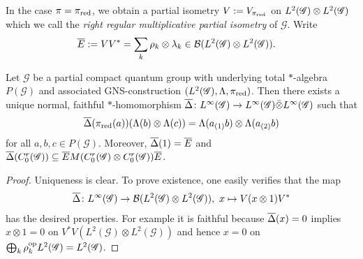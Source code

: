 In the case  $\pi=\pi_{\operatorname{\mathrm{red}}}$, we obtain a partial isometry
$V:=V_{\pi_{\operatorname{\mathrm{red}}}}$ on $L^{2}(\mathscr{G}) \otimes L^{2}(\mathscr{G})$ which we call the
\emph{right regular multiplicative partial isometry} of
$\mathscr{G}$. Write
\begin{align*}
  \overline{E} &:=VV^{*} = \sum_{k} \rho_{k} \otimes \lambda_{k} \in
  \mathcal{B}(L^{2}(\mathscr{G}) \otimes L^{2}(\mathscr{G})).
\end{align*}
\begin{Prop} \label{prop:vn-delta} Let $\mathscr{G}$ be a partial
  compact quantum group with underlying total $*$-algebra
  $P(\mathscr{G})$ and associated GNS-construction
  $(L^{2}(\mathscr{G}),\Lambda,\pi_{\operatorname{\mathrm{red}}})$. Then there
  exists a unique normal, faithful $*$-homomorphism $\overline{\Delta} \colon
  L^{\infty}(\mathscr{G}) \to L^{\infty}(\mathscr{G}) \bar{\otimes} L^{\infty}(\mathscr{G})$ such that
  \begin{align*}
    \overline{\Delta}(\pi_{\operatorname{\mathrm{red}}}(a)) (\Lambda(b) \otimes \Lambda(c)) =
    \Lambda(a_{(1)}b) \otimes \Lambda(a_{(2)}b) 
  \end{align*}
  for all $a,b,c \in P(\mathscr{G})$. Moreover, $\overline{\Delta}(1)=\overline{E}$ and
  $\overline{\Delta}(C^{r}_{0}(\mathscr{G})) \subseteq \overline{E} M(C^{r}_{0}(\mathscr{G}) \otimes
  C^{r}_{0}(\mathscr{G}))\overline{E}$.
\end{Prop}
\begin{proof}
  Uniqueness is clear. To prove existence, one easily verifies that
  the map
  \begin{align*}
 \overline{\Delta} \colon L^{\infty}(\mathscr{G}) \to {\cal B}(L^{2}(\mathscr{G}) \otimes L^{2}(\mathscr{G})), \ x
  \mapsto V(x \otimes 1)V^{*}   
  \end{align*}
  has the desired properties. For example it is faithful because
  $\overline{\Delta}(x)=0$ implies $x\otimes 1=0$ on $V^{*}V(L^{2}(\mathscr{G})
  \otimes L^{2}(\mathscr{G}))$ and hence $x=0$ on $\bigoplus_{k}
  \rho_{k}^{\operatorname{\mathrm{op}}}L^{2}(\mathscr{G})=L^{2}(\mathscr{G})$.
\end{proof}





